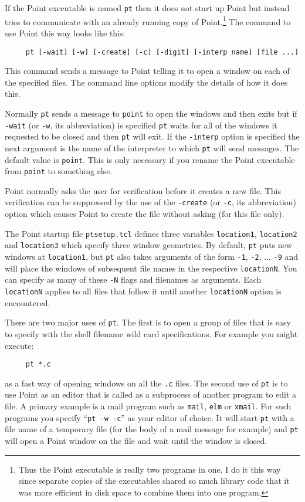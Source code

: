 If the Point executable is named {\tt pt} then it does not start up
Point but instead tries to communicate with an already running
copy of Point.\footnote{
	Thus the Point executable is really two programs in one.
	I do it this way since separate copies of the executables
	shared so much library code that it was more efficient
	in disk space to combine them into one program.}
The command to use Point this way looks like this:
\begin{verbatim}
     pt [-wait] [-w] [-create] [-c] [-digit] [-interp name] [file ...]
\end{verbatim}
This command sends a message to Point telling it to open
a window on each of the specified files.
The command line options modify the details of how it does this.

Normally {\tt pt} sends a message to {\tt point} to open the windows
and then exits but
if {\tt -wait} (or {\tt -w}, its abbreviation) is specified
{\tt pt} waits for all of the windows it requested to be closed
and then {\tt pt} will exit.
If the {\tt -interp} option is specified the next argument is the
name of the interpreter to which {\tt pt} will send messages.
The default value is {\tt point}.
This is only necessary if you rename the Point executable from
{\tt point} to something else.

Point normally asks the user for verification before it creates
a new file.
This verification can be suppressed by the use of the {\tt -create}
(or {\tt -c}, its abbreviation) option which causes Point to create
the file without asking (for this file only).

The Point startup file {\tt ptsetup.tcl} defines three variables
{\tt location1}, {\tt location2} and {\tt location3} which
specify three window geometries.
By default, {\tt pt} puts new windows at {\tt location1},
but {\tt pt} also takes arguments of the form {\tt -1}, {\tt -2}, ...
{\tt -9} and will place the windows of subsequent file names
in the respective {\tt locationN}.
You can specify as many of these {\tt -N} flags and filenames
as arguments.
Each {\tt locationN} applies to all files that follow it until another
{\tt locationN} option is encountered.

There are two major uses of {\tt pt}.
The first is to open a group of files that is easy to specify
with the shell filename wild card specifications.
For example you might execute:
\begin{verbatim}
     pt *.c
\end{verbatim}
as a fast way of opening windows on all the {\tt .c} files.
The second use of {\tt pt} is to use Point as an editor
that is called as a subprocess of another program to
edit a file.
A primary example is a mail program such as {\tt mail},
{\tt elm} or {\tt xmail}.
For such programs you specify ``{\tt pt -w -c}'' as your editor of choice.
It will start {\tt pt} with a file name of a temporary file
(for the body of a mail message for example) and {\tt pt} will
open a Point window on the file and wait until the window is closed.




